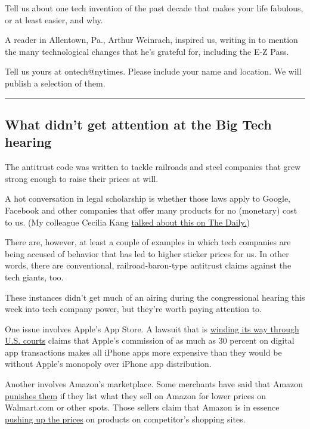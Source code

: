 Tell us about one tech invention of the past decade that makes your life
fabulous, or at least easier, and why.

A reader in Allentown, Pa., Arthur Weinrach, inspired us, writing in to
mention the many technological changes that he's grateful for, including
the E-Z Pass.

Tell us yours at ontech@nytimes. Please include your name and location.
We will publish a selection of them.

\begin{center}\rule{0.5\linewidth}{\linethickness}\end{center}

\hypertarget{what-didnt-get-attention-at-the-big-tech-hearing}{%
\subsection{What didn't get attention at the Big Tech
hearing}\label{what-didnt-get-attention-at-the-big-tech-hearing}}

The antitrust code was written to tackle railroads and steel companies
that grew strong enough to raise their prices at will.

A hot conversation in legal scholarship is whether those laws apply to
Google, Facebook and other companies that offer many products for no
(monetary) cost to us. (My colleague Cecilia Kang
\href{https://www.nytimes3xbfgragh.onion/2020/07/30/podcasts/the-daily/congress-facebook-amazon-google-apple.html}{talked
about this on The Daily.})

There are, however, at least a couple of examples in which tech
companies are being accused of behavior that has led to higher sticker
prices for us. In other words, there are conventional,
railroad-baron-type antitrust claims against the tech giants, too.

These instances didn't get much of an airing during the congressional
hearing this week into tech company power, but they're worth paying
attention to.

One issue involves Apple's App Store. A lawsuit that is
\href{https://www.nytimes3xbfgragh.onion/2019/05/13/us/politics/supreme-court-antitrust-apple.html}{winding
its way through U.S. courts} claims that Apple's commission of as much
as 30 percent on digital app transactions makes all iPhone apps more
expensive than they would be without Apple's monopoly over iPhone app
distribution.

Another involves Amazon's marketplace. Some merchants have said that
Amazon
\href{https://www.nytimes3xbfgragh.onion/2019/12/19/technology/amazon-sellers.html}{punishes
them} if they list what they sell on Amazon for lower prices on
Walmart.com or other spots. Those sellers claim that Amazon is in
essence
\href{https://www.bloomberg.com/news/articles/2019-08-05/amazon-is-squeezing-sellers-that-offer-better-prices-on-walmart}{pushing
up the prices} on products on competitor's shopping sites.

